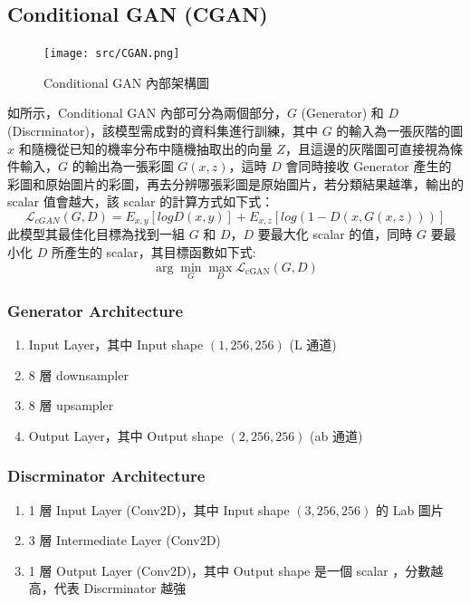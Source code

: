 \documentclass[a4paper, 12pt]{article}
\begin{document}
\begin{CJK}{UTF8}{bkai}
		\subsection{Conditional GAN (CGAN)}
			\begin{figure}[tbh]
				\centering
				\texttt{[image: src/CGAN.png]}
				\caption{Conditional GAN 內部架構圖 \cite{hungyiML}}
				\label{fig-CGAN}
			\end{figure}
			如所示，Conditional GAN 內部可分為兩個部分，$G$ (Generator) 和 $D$ (Discrminator)，該模型需成對的資料集進行訓練，其中 $G$ 的輸入為一張灰階的圖 $x$ 和隨機從已知的機率分布中隨機抽取出的向量 $Z$，且這邊的灰階圖可直接視為條件輸入，$G$ 的輸出為一張彩圖 $G(x, z)$，這時 $D$ 會同時接收 Generator 產生的彩圖和原始圖片的彩圖，再去分辨哪張彩圖是原始圖片，若分類結果越準，輸出的 scalar 值會越大，該 scalar 的計算方式如下式：
			\begin{equation}
				\mathcal{L}_{cGAN}(G,D) = E_{x,y}\left[ logD(x,y) \right] + E_{x,z}\left[ log(1 - D(x,G(x,z))) \right]
			\end{equation}
			此模型其最佳化目標為找到一組 $G$ 和 $D$，$D$ 要最大化 scalar 的值，同時 $G$ 要最小化 $D$ 所產生的 scalar，其目標函數如下式:
			\begin{equation}
				\arg \min_G \max_D \mathcal{L}_{\text{cGAN}}(G, D)
			\end{equation}
			\subsubsection{Generator Architecture}
			\begin{enumerate}
				\item Input Layer，其中 Input shape $(1, 256, 256)$  (L 通道)
				\item 8 層 downsampler
				\item 8 層 upsampler
				\item Output Layer，其中 Output shape $(2, 256, 256)$ (ab 通道)
			\end{enumerate}

			\subsubsection{Discrminator Architecture}
			\begin{enumerate}
				\item 1 層 Input Layer (Conv2D)，其中 Input shape $(3, 256, 256)$ 的 Lab 圖片
				\item 3 層 Intermediate Layer (Conv2D)
				\item 1 層 Output Layer (Conv2D)，其中 Output shape 是一個 scalar ，分數越高，代表 Discrminator 越強
			\end{enumerate}



\end{CJK}
\end{document}
